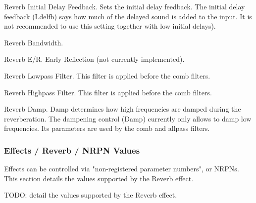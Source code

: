    Reverb Initial Delay Feedback.
   Sets the initial delay feedback.
   The initial delay feedback (I.delfb) says how much
   of the delayed sound is added to the input.
   It is not recommended to use this setting together with
   low initial delays).

   Reverb Bandwidth.

   Reverb E/R.
   Early Reflection (not currently implemented).

   Reverb Lowpass Filter.
   This filter is applied before the comb filters.

   Reverb Highpass Filter.
   This filter is applied before the comb filters.

   Reverb Damp.
   Damp determines how high frequencies are damped during the
   reverberation.  The dampening control (Damp) currently only allows to
   damp low frequencies. Its parameters are used by the comb and allpass
   filters.
\iffalse
??? This doesn't belong here.
   \itempar{FX No}{reverb!fx no.}
   Reverb FX Number.

   Values: \texttt{1 to 8?}

   \itempar{bypass}{reverb!fx bypass}
   Reverb FX Bypass.

   Values: \texttt{Off*, On}

   \itempar{EffType}{reverb!eff type}
   Reverb Effect Type.

   Values: \texttt{Reverb, EQ, Echo, etc. TODO}

   \itempar{Send To}{reverb!send to}
   Reverb Send To.
   This user-interface drop-down is shown only in the
   \textbf{Part / Edit / Effects} version of the effects panel.

   Values: \texttt{Next Effect, Part Out, Dry Out}

   \itempar{C}{reverb!copy}
   Reverb Copy.

   \itempar{P}{reverb!paste}
   Reverb Paste.

   \itempar{Close}{reverb!close}
   Close Window.
\fi
\subsubsection{Effects / Reverb / NRPN Values}
\label{subsubsec:effects_edit_reverb_nrpn}

   Effects can be controlled via "non-registered parameter numbers", or NRPNs.
   This section details the values supported by the Reverb effect.

   TODO:  detail the values supported by the Reverb effect.

